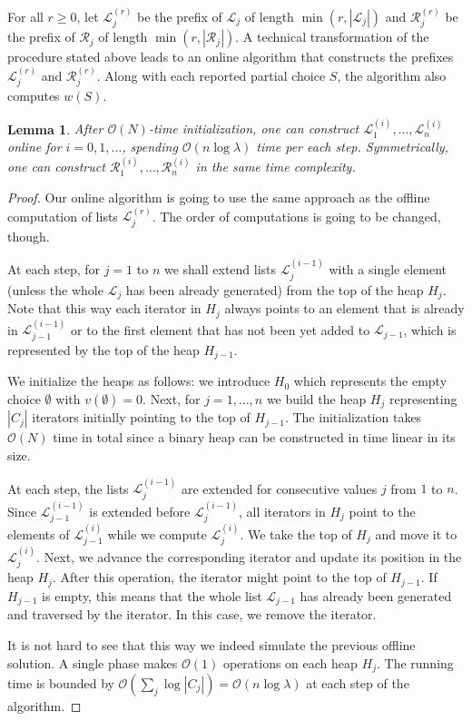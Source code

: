 \documentclass{article}
\theoremstyle{plain}
\newtheorem{lemma}[theorem]{Lemma}
\theoremstyle{definition}
\newcommand{\Oh}{\mathcal{O}}
\renewcommand{\L}{\mathcal{L}}
\newcommand{\R}{\mathcal{R}}
\begin{document}
  For all $r \ge 0$, let $\L^{(r)}_j$ be the prefix of $\L_j$ of length $\min(r,|\L_j|)$ and $\R^{(r)}_j$ be the prefix of $\R_j$ of length $\min(r, |\R_j|)$.
  A technical transformation of the procedure stated above
  leads to an online algorithm that constructs the prefixes $\L^{(r)}_j$ and $\R^{(r)}_j$.
  Along with each reported partial choice $S$, the algorithm also computes $w(S)$.
  

  \begin{lemma}\label{lem:generate}
    After $\Oh(N)$-time initialization, one can construct $\L^{(i)}_1,\ldots,\L^{(i)}_n$
    online for $i=0,1,\ldots$, spending $\Oh(n\log \lambda)$ time per each step.
    Symmetrically, one can construct $\R^{(i)}_1,\ldots,\R^{(i)}_n$ in the same time complexity.
  \end{lemma}
   \begin{proof}
      Our online algorithm is going to use the same approach as the offline computation of lists $\L_j^{(r)}$.
      The order of computations is going to be changed, though.
      
      At each step, for $j=1$ to $n$ we shall extend lists $\L^{(i-1)}_j$ with a single element 
      (unless the whole $\L_j$ has been already generated) from the top of the heap $H_j$.
      Note that this way each iterator in $H_j$ always points to an element 
      that is already in $\L^{(i-1)}_{j-1}$ or to the first element that has not been yet added to $\L_{j-1}$,
      which is represented by the top of the heap $H_{j-1}$. 
      
      We initialize the heaps as follows: we introduce $H_0$ which represents the empty choice $\emptyset$ with $v(\emptyset)=0$.
      Next, for $j=1,\ldots,n$ we build the heap $H_j$ representing $|C_j|$ iterators initially pointing to the top of $H_{j-1}$.
      The initialization takes $\Oh(N)$ time in total since a binary heap can be constructed in time linear in its size.
      
      At each step, the lists $\L^{(i-1)}_j$ are extended for consecutive values $j$ from $1$ to $n$. 
      Since $\L^{(i-1)}_{j-1}$ is extended before $\L^{(i-1)}_j$, all iterators in $H_j$ point to the elements of $\L^{(i)}_{j-1}$ while we compute $\L_j^{(i)}$.
      We take the top of $H_j$ and move it to $\L^{(i)}_j$.
      Next, we advance the corresponding iterator and update its position in the heap $H_j$.
      After this operation, the iterator might point to the top of $H_{j-1}$.
      If $H_{j-1}$ is empty, this means that the whole list $\L_{j-1}$ has already been generated and traversed by the iterator.
      In this case, we remove the iterator.
      
      It is not hard to see that this way we indeed simulate the previous offline solution.
      A single phase makes $\Oh(1)$ operations on each heap $H_j$.
      The running time is bounded by $\Oh(\sum_{j} \log |C_j|)=\Oh(n\log \lambda)$ at each step of the algorithm.
    \end{proof}
\end{document}
